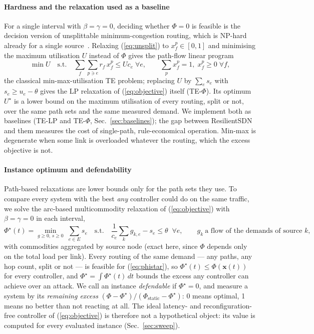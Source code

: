\paragraph{Hardness and the relaxation used as a baseline}
For a single interval with $\beta=\gamma=0$, deciding whether $\Phi=0$ is feasible is the
decision version of unsplittable minimum-congestion routing, which is NP-hard already for a single
source~\cite{kleinberg1996unsplittable}. Relaxing (\ref{eq:unsplit}) to $x_f^p\in[0,1]$ and
minimising the maximum utilisation $U$ instead of $\Phi$ gives the path-flow linear program
\begin{equation}
  \min U\quad\text{s.t.}\quad
  \sum_{f}\sum_{p\ni e} r_f\,x_f^p\le U c_e\;\forall e,\qquad
  \sum_{p}x_f^p=1,\; x_f^p\ge 0\;\forall f,
  \label{eq:lp}
\end{equation}
the classical min-max-utilisation TE problem; replacing $U$ by $\sum_e s_e$ with
$s_e\ge u_e-\theta$ gives the LP relaxation of (\ref{eq:objective}) itself (TE-$\Phi$). Its optimum $U^\star$ is a lower bound on the
maximum utilisation of every routing, split or not, over the same path sets and the same measured
demand. We implement both as baselines (TE-LP and TE-$\Phi$, Sec.~\ref{sec:baselines}); the gap between
ResilientSDN and them measures the cost of single-path, rule-economical operation. Min-max is
degenerate when some link is overloaded whatever the routing, which the excess objective is not.

\paragraph{Instance optimum and defendability}
Path-based relaxations are lower bounds only for the path sets they use. To compare every system
with the best \emph{any} controller could do on the same traffic, we solve the arc-based
multicommodity relaxation of (\ref{eq:objective}) with $\beta=\gamma=0$ in each interval,
\begin{equation}
  \Phi^\star(t)=\min_{g\ge0,\,s\ge0}\;\sum_{e\in E}s_e\quad\text{s.t.}\quad
  \frac{1}{c_e}\sum_{k}g_{k,e}-s_e\le\theta\;\;\forall e,\qquad
  g_k\ \text{a flow of the demands of source }k,
  \label{eq:phistar}
\end{equation}
with commodities aggregated by source node (exact here, since $\Phi$ depends only on the total load per
link). Every routing of the same demand --- any paths, any hop count, split or not --- is feasible for
(\ref{eq:phistar}), so $\Phi^\star(t)\le\Phi(\mathbf{x}(t))$ for every controller, and
$\Phi^\star=\int\Phi^\star(t)\,dt$ bounds the excess any controller can achieve over an attack. We
call an instance \emph{defendable} if $\Phi^\star=0$, and measure a system by its
\emph{remaining excess} $(\Phi-\Phi^\star)/(\Phi_{\mathrm{static}}-\Phi^\star)$: 0 means optimal, 1
means no better than not reacting at all. The ideal latency- and reconfiguration-free controller of
(\ref{eq:objective}) is therefore not a hypothetical object: its value is computed for every evaluated
instance (Sec.~\ref{sec:sweep}).

